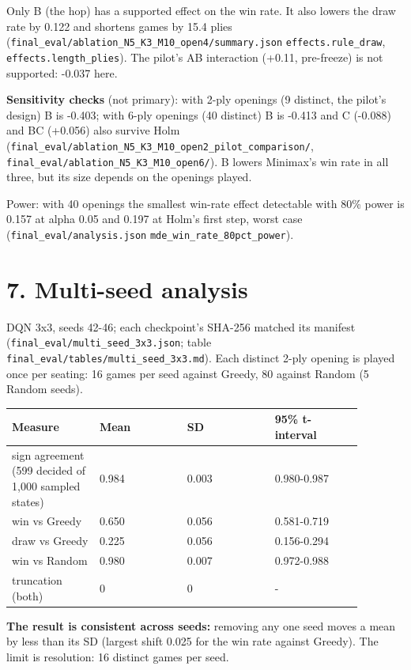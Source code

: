 \documentclass[11pt]{article}
\begin{document}
Only B (the hop) has a supported effect on the win rate. It also lowers the draw rate by 0.122
and shortens games by 15.4 plies (\texttt{final\_eval/ablation\_N5\_K3\_M10\_open4/summary.json}
\texttt{effects.rule\_draw}, \texttt{effects.length\_plies}). The pilot's AB interaction (+0.11, pre-freeze) is
not supported: -0.037 here.

\textbf{Sensitivity checks} (not primary): with 2-ply openings (9 distinct, the pilot's design) B is
-0.403; with 6-ply openings (40 distinct) B is -0.413 and C (-0.088) and BC (+0.056) also survive
Holm (\texttt{final\_eval/ablation\_N5\_K3\_M10\_open2\_pilot\_comparison/}, \texttt{final\_eval/ablation\_N5\_K3\_M10\_open6/}).
B lowers Minimax's win rate in all three, but its size depends on the openings played.

Power: with 40 openings the smallest win-rate effect detectable with 80\% power is 0.157 at
alpha 0.05 and 0.197 at Holm's first step, worst case (\texttt{final\_eval/analysis.json}
\texttt{mde\_win\_rate\_80pct\_power}).

\section{7. Multi-seed analysis}

DQN 3x3, seeds 42-46; each checkpoint's SHA-256 matched its manifest (\texttt{final\_eval/multi\_seed\_3x3.json};
table \texttt{final\_eval/tables/multi\_seed\_3x3.md}). Each distinct 2-ply opening is played once per
seating: 16 games per seed against Greedy, 80 against Random (5 Random seeds).

\begin{center}\scriptsize
\begin{longtable}{p{0.22\linewidth}p{0.22\linewidth}p{0.22\linewidth}p{0.22\linewidth}}
\toprule
Measure & Mean & SD & 95\% t-interval \\
\midrule
sign agreement (599 decided of 1,000 sampled states) & 0.984 & 0.003 & 0.980-0.987 \\
win vs Greedy & 0.650 & 0.056 & 0.581-0.719 \\
draw vs Greedy & 0.225 & 0.056 & 0.156-0.294 \\
win vs Random & 0.980 & 0.007 & 0.972-0.988 \\
truncation (both) & 0 & 0 & - \\
\bottomrule
\end{longtable}
\end{center}

\textbf{The result is consistent across seeds:} removing any one seed moves a mean by less than its SD
(largest shift 0.025 for the win rate against Greedy). The limit is resolution: 16 distinct games
per seed.
\end{document}
